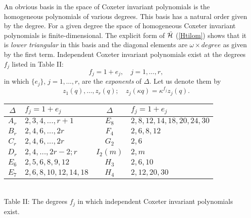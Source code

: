 \documentclass[a4paper,12pt]{article}
\begin{document}
An obvious basis in the space of Coxeter invariant polynomials is the
homogeneous polynomials of various degrees.
This basis has a natural order given by the degree.
For a given degree the space
of homogeneous Coxeter invariant polynomials is  finite-dimensional.
The explicit form of
\(\tilde{\cal H}\) (\ref{Htilom}) shows that it is {\em lower triangular\/}
in this basis and the diagonal elements are
\(\omega\times degree\) as given by the first term.
Independent Coxeter invariant polynomials exist
at the degrees \(f_j\) listed in
Table II:
\begin{equation}
   f_j=1+e_j,\quad j=1,\ldots,r,
   \label{coxinvdeg}
\end{equation}
in which \(\{e_j\}\), \(j=1,\ldots,r\), are the {\em exponents\/} of
\(\Delta\). Let us denote them by
\begin{equation}
z_1(q),\ldots,z_r(q);\quad z_j(\kappa q)=\kappa^{f_j}z_j(q).
\label{zbasis}
\end{equation}

\begin{center}
    \begin{tabular}{||c|l||c|l||}
       \hline%
        \(\Delta\)& \(f_j=1+e_j\) &\(\Delta\)& \(f_j=1+e_j\)\\
       \hline
       \(A_r\) & \(2,3,4,\ldots,r+1\) & \(E_8\) & \(2,8,12,14,18,20,24,30\)
\\
       \hline
       \(B_r\) & \(2,4,6,\ldots,2r\) & \(F_4\) & \(2,6,8,12\) \\
       \hline
       \(C_r\) & \(2,4,6,\ldots,2r\) & \(G_2\) & \(2,6\) \\
       \hline
      \(D_r\) & \(2,4,\ldots,2r-2;r\) & \(I_2(m)\) & \(2,m\) \\
      \hline
      \(E_6\) & \(2,5,6,8,9,12\) & \(H_3\) & \(2,6,10\) \\
      \hline
      \(E_7\) & \(2,6,8,10,12,14,18\) & \(H_4\) & \(2,12,20,30\) \\
      \hline
    \end{tabular}\\
 \bigskip
 Table II: The degrees \(f_j\) in which independent Coxeter
invariant polynomials exist.
\end{center}
\end{document}
